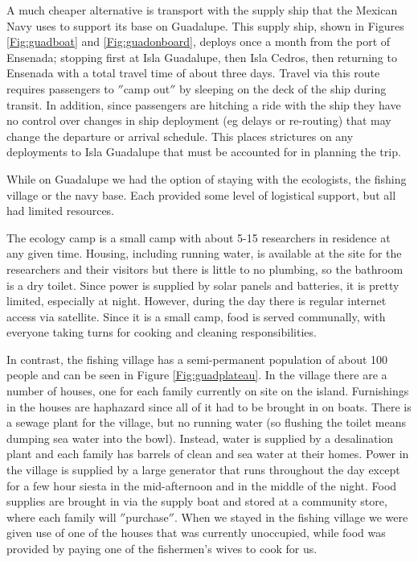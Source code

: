 A much cheaper alternative is transport with the supply ship that the Mexican Navy uses to support its base on Guadalupe. This supply ship, shown in Figures \ref{Fig:guadboat} and \ref{Fig:guadonboard}, deploys once a month from the port of Ensenada; stopping first at Isla Guadalupe, then Isla Cedros, then returning to Ensenada with a total travel time of about three days. Travel via this route requires passengers to $''$camp out$''$ by sleeping on the deck of the ship during transit. In addition, since passengers are hitching a ride with the ship they have no control over changes in ship deployment (eg delays or re-routing) that may change the departure or arrival schedule. This places strictures on any deployments to Isla Guadalupe that must be accounted for in planning the trip. 

While on Guadalupe we had the option of staying with the ecologists, the fishing village or the navy base. Each provided some level of logistical support, but all had limited resources. 

The ecology camp is a small camp with about 5-15 researchers in residence at any given time. Housing, including running water, is available at the site for the researchers and their visitors but there is little to no plumbing, so the bathroom is a dry toilet.  Since power is supplied by solar panels and batteries, it is pretty limited, especially at night. However, during the day there is regular internet access via satellite. Since it is a small camp, food is served communally, with everyone taking turns for cooking and cleaning responsibilities. 

In contrast, the fishing village has a semi-permanent population of about 100 people and can be seen in Figure \ref{Fig:guadplateau}. In the village there are a number of houses, one for each family currently on site on the island. Furnishings in the houses are haphazard since all of it had to be brought in on boats. There is a sewage plant for the village, but no running water (so flushing the toilet means dumping sea water into the bowl). Instead, water is supplied by a desalination plant and each family has barrels of clean and sea water at their homes. Power in the village is supplied by a large generator that runs throughout the day except for a few hour siesta in the mid-afternoon and in the middle of the night. Food supplies are brought in via the supply boat and stored at a community store, where each family will $''$purchase$''$. When we stayed in the fishing village we were given use of one of the houses that was currently unoccupied, while food was provided by paying one of the fishermen's wives to cook for us. 

